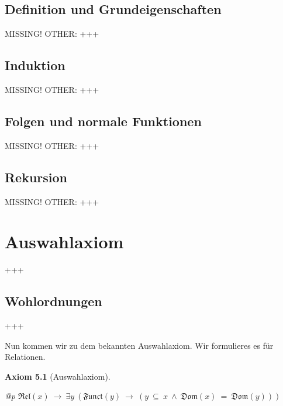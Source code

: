 \documentclass[a4paper,german,10pt,twoside]{book}
\newtheorem{ax}{Axiom}
\theoremstyle{definition}
\theoremstyle{remark}
\begin{document}
\section{Definition und Grundeigenschaften} \label{chapter5_section1} \hypertarget{chapter5_section1}{}
MISSING! OTHER: +++

\section{Induktion} \label{chapter5_section2} \hypertarget{chapter5_section2}{}
MISSING! OTHER: +++

\section{Folgen und normale Funktionen} \label{chapter5_section3} \hypertarget{chapter5_section3}{}
MISSING! OTHER: +++

\section{Rekursion} \label{chapter5_section4} \hypertarget{chapter5_section4}{}
MISSING! OTHER: +++



\chapter{Auswahlaxiom} \label{chapter6} \hypertarget{chapter6}{}

+++

\section{Wohlordnungen} \label{chapter6_section0} \hypertarget{chapter6_section0}{}
+++

\par
Nun kommen wir zu dem bekannten Auswahlaxiom. Wir formulieres es f{\"u}r Relationen.

\begin{ax}[Auswahlaxiom]
\label{axiom:choice} \hypertarget{axiom:choice}{}
\mbox{}
\begin{longtable}{{@{\extracolsep{\fill}}p{\linewidth}}}
\centering $\mathfrak{Rel}(x)\ \rightarrow \ \exists y\ (\mathfrak{Funct}(y)\ \rightarrow \ (y \ \subseteq \ x\ \land \ \mathfrak{Dom}(x) \ =  \ \mathfrak{Dom}(y)))$
\end{longtable}

\end{ax}
\end{document}
